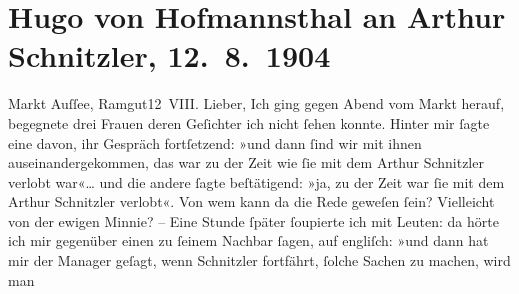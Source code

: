 

               \section[Hugo von Hofmannsthal an Arthur Schnitzler, 12. 8. 1904]{ Hugo von Hofmannsthal an Arthur Schnitzler, 12. 8. 1904}\nopagebreak{}\rehead{ }\begin{ledgroupsized}[t]{13cm}\normalsize\beginnumbering{} \toendnotes[C]{\smallbreak\pagebreak[2]} 
\toendnotes[C]{\smallbreak}\pstart
           \raggedleft{}{\pb}Markt Auſſee, Ramgut12 VIII.\pend
           \pstart{}Lieber,\pend\pstart
           Ich ging gegen Abend vom Markt herauf, begegnete
               drei Frauen deren Geſichter ich nicht ſehen konnte. Hinter mir ſagte eine davon, ihr
               Gespräch fortſetzend: »und dann ſind wir mit ihnen auseinandergekommen, das war zu
               der Zeit wie ſie mit dem Arthur Schnitzler verlobt war«{\dots}
               und die andere ſagte beſtätigend: »ja, zu der Zeit war ſie mit {\pb}dem Arthur Schnitzler verlobt«.
               Von wem kann da die Rede geweſen ſein? Vielleicht von der ewigen Minnie?\pend
           \pstart
           \numberlinefalse{}\centering{}–\numberlinetrue{}\pend
           \pstart
           \noindent{}Eine Stunde ſpäter ſoupierte ich mit Leuten: da hörte ich mir gegenüber einen  zu ſeinem Nachbar ſagen, auf engliſch: »und dann
               hat mir der Manager geſagt, wenn Schnitzler fortfährt, {\pb}ſolche Sachen zu machen, wird man

\end{ledgroupsized}

